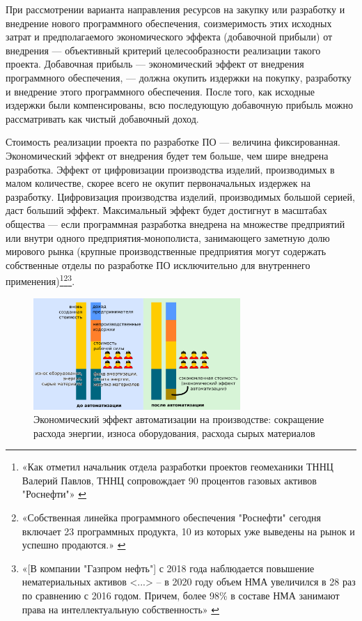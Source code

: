 \documentclass{article}
\begin{document}
При рассмотрении варианта направления ресурсов на закупку или разработку и внедрение нового программного обеспечения, соизмеримость этих исходных затрат и предполагаемого экономического эффекта (добавочной прибыли) от внедрения — объективный критерий целесообразности реализации такого проекта. Добавочная прибыль — экономический эффект от внедрения программного обеспечения, — должна окупить издержки на покупку, разработку и внедрение этого программного обеспечения. После того, как исходные издержки были компенсированы, всю последующую добавочную прибыль можно рассматривать как чистый добавочный доход.

Стоимость реализации проекта по разработке ПО — величина фиксированная. Экономический эффект от внедрения будет тем больше, чем шире внедрена разработка. Эффект от цифровизации производства изделий, производимых в малом количестве, скорее всего не окупит первоначальных издержек на разработку. Цифровизация производства изделий, производимых большой серией, даст больший эффект. Максимальный эффект будет достигнут в масштабах общества — если программная разработка внедрена на множестве предприятий или внутри одного предприятия-монополиста, занимающего заметную долю мирового рынка (крупные производственные предприятия могут содержать собственные отделы по разработке ПО исключительно для внутреннего применения)\footnote{«Как отметил начальник отдела разработки проектов геомеханики ТННЦ Валерий Павлов, ТННЦ сопровождает 90 процентов газовых активов "Роснефти"» \cite{rosneftSoftware2022}}\footnote{«Собственная линейка программного обеспечения "Роснефти" сегодня включает 23 программных продукта, 10 из которых уже выведены на рынок и успешно продаются.» \cite{rosneftSoftware2023}}\footnote{«[В компании "Газпром нефть"] с 2018 года наблюдается повышение нематериальных активов <...> – в 2020 году объем НМА увеличился в 28 раз по сравнению с 2016 годом. Причем, более 98\% в составе НМА занимают права на интеллектуальную собственность» \cite{digitalTransformRus2021}}.

\begin{figure}[h]
    \centering
    \includegraphics[width=0.70\textwidth]{effect-raw-materials}
    \caption{Экономический эффект автоматизации на производстве: сокращение расхода энергии, износа оборудования, расхода сырых материалов}
    \label{fig:effect_raw_materials}
\end{figure}
\end{document}
